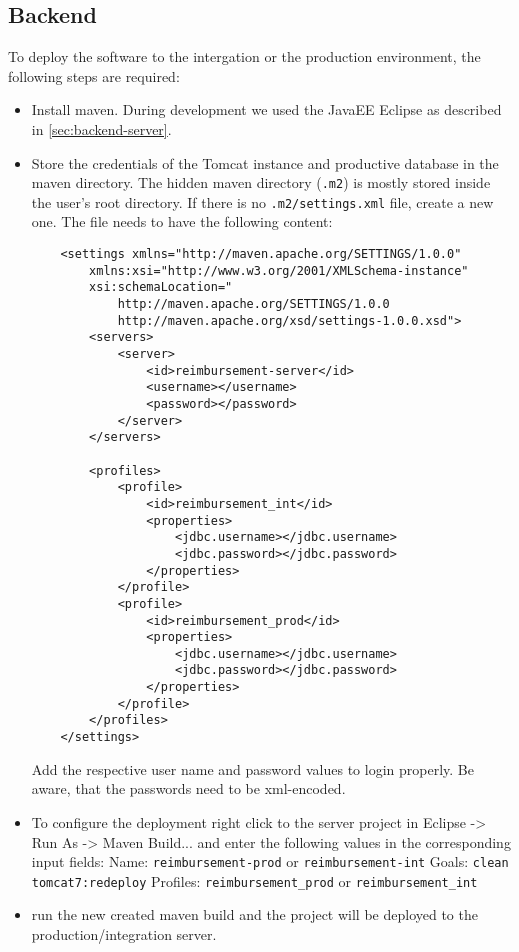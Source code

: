 \subsection{Backend}

To deploy the software to the intergation or the production environment, the following steps are required:

\begin{itemize}
    \item Install maven. During development we used the JavaEE Eclipse as described in  \ref{sec:backend-server}.
    \item Store the credentials of the Tomcat instance and productive database in the maven directory. The hidden maven directory (\texttt{.m2}) is mostly stored inside the user's root directory. If there is no \texttt{.m2/settings.xml} file, create a new one. The file needs to have the following content:

    \begin{lstlisting}
    <settings xmlns="http://maven.apache.org/SETTINGS/1.0.0"
        xmlns:xsi="http://www.w3.org/2001/XMLSchema-instance"
        xsi:schemaLocation="
            http://maven.apache.org/SETTINGS/1.0.0
            http://maven.apache.org/xsd/settings-1.0.0.xsd">
    	<servers>
    		<server>
    			<id>reimbursement-server</id>
    			<username></username>
    			<password></password>
    		</server>
    	</servers>

    	<profiles>
    		<profile>
    			<id>reimbursement_int</id>
    			<properties>
    				<jdbc.username></jdbc.username>
    				<jdbc.password></jdbc.password>
    			</properties>
    		</profile>
    		<profile>
    			<id>reimbursement_prod</id>
    			<properties>
    				<jdbc.username></jdbc.username>
    				<jdbc.password></jdbc.password>
    			</properties>
    		</profile>
    	</profiles>
    </settings>
    \end{lstlisting}

    Add the respective user name and password values to login properly. Be aware, that the passwords need to be xml-encoded.

    \item To configure the deployment right click to the server project in Eclipse -> Run As -> Maven Build... and enter the following values in the corresponding input fields:
    \newline
    Name: \texttt{reimbursement-prod} or  \texttt{reimbursement-int}
    \newline
    Goals: \texttt{clean tomcat7:redeploy}
    \newline
    Profiles: \texttt{reimbursement\_prod} or \texttt{reimbursement\_int}
    \item run the new created maven build and the project will be deployed to the production/integration server.

\end{itemize}

